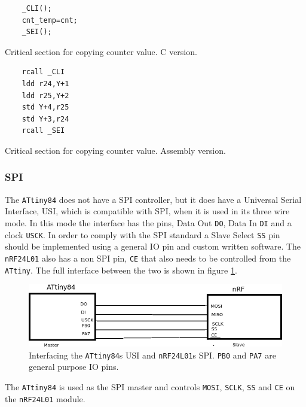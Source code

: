 \begin{listing}[h] 
\begin{verbatim}
	_CLI();
	cnt_temp=cnt;
	_SEI();
\end{verbatim}
\caption{Critical section for copying counter value. C version.}
\label{code:critical_section_c}
\end{listing}

{\renewcommand\fcolorbox[4][]{\textcolor{cyan}{\strut#4}}
\begin{listing}[h]
\begin{verbatim}
	rcall _CLI
	ldd r24,Y+1
	ldd r25,Y+2
	std Y+4,r25
	std Y+3,r24
	rcall _SEI
\end{verbatim}
\caption{Critical section for copying counter value. Assembly version.}
\label{code:critical_section_asm}
\end{listing}


\subsubsection{SPI} %
\label{ssub:spi}
The \texttt{ATtiny84} does not have a SPI controller, but it does have a Universal Serial Interface, USI, which is compatible with SPI, when it is used in its three wire mode.
In this mode the interface has the pins, Data Out \texttt{DO}, Data In \texttt{DI} and a clock \texttt{USCK}.
In order to comply with the SPI standard a Slave Select \texttt{SS} pin should be implemented using a general IO pin and custom written software.
The \texttt{nRF24L01} also has a non SPI pin, \texttt{CE} that also needs to be controlled from the \texttt{ATtiny}.
The full interface between the two is shown in figure \ref{fig:tiny_nrf_com}.

\begin{figure}[h]
	\centering
	\includegraphics[width=.35\linewidth]{graphics/tiny_nrf_com}
	\caption[Interface between ATtiny84 and nRF24L01.]{Interfacing the \texttt{ATtiny84}s USI and \texttt{nRF24L01}s SPI. \texttt{PB0} and \texttt{PA7} are general purpose IO pins.}
	\label{fig:tiny_nrf_com}
\end{figure}
The \texttt{ATtiny84} is used as the SPI master and controls \texttt{MOSI}, \texttt{SCLK}, \texttt{SS} and \texttt{CE} on the \texttt{nRF24L01} module.

}
